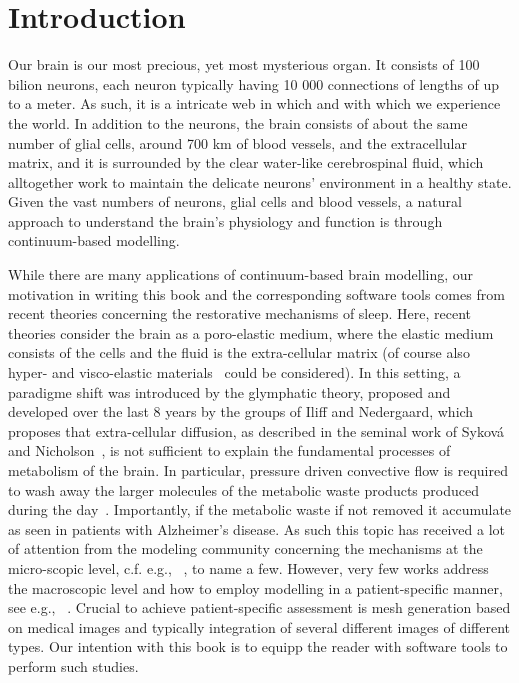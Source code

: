 \chapter{Introduction}
\label{chp:chp1}

Our brain is our most precious, yet most mysterious organ. It consists
of 100 bilion neurons, each neuron typically having 10 000 connections
of lengths of up to a meter. As such, it is a intricate web in which
and with which we experience the world. In addition to the neurons,
the brain consists of about the same number of glial cells, around 700
km of blood vessels, and the extracellular matrix, and it is
surrounded by the clear water-like cerebrospinal fluid, which
alltogether work to maintain the delicate neurons' environment in a
healthy state. Given the vast numbers of neurons, glial cells and
blood vessels, a natural approach to understand the brain's physiology
and function is through continuum-based modelling.

While there are many applications of continuum-based brain modelling, our
motivation in writing this book and the corresponding software tools  comes from recent theories 
concerning the restorative mechanisms of sleep. Here, recent theories 
consider the brain as a poro-elastic medium, where the elastic medium consists of the cells
and the fluid is the extra-cellular matrix (of course also hyper- and visco-elastic 
materials~\cite{goriely2015mechanics, budday2019fifty} could be considered). 
In this setting, a paradigme shift was introduced by the glymphatic theory, proposed and developed over the last 8 years by the 
groups of Iliff and Nedergaard, which proposes that
extra-cellular diffusion, as described in the seminal work
of Sykov{\'a} and Nicholson~\cite{sykova2008diffusion}, is
not sufficient to explain the fundamental processes of metabolism of the brain. 
In particular, pressure driven convective flow  is
required to wash away the larger molecules of the metabolic waste products
produced during the day~\cite{iliff2012paravascular,
  jessen2015glymphatic, xie2013sleep}. Importantly,  if the metabolic waste 
if not removed it accumulate as seen  in patients with  Alzheimer's disease. 
As such this topic has received a lot of attention from the modeling 
community concerning the mechanisms at the micro-scopic level,
c.f. e.g., ~\cite{aldea2019cerebrovascular, daversin2020mechanisms, diem2017arterial, 
holter2017interstitial, ray2019analysis, sharp2019dispersion, smith2017test}, to name a few. 
However, very few works address the macroscopic level and how to employ modelling in a patient-specific
manner, see e.g., ~\cite{chou2016fully, lee2019mixed}. Crucial to achieve patient-specific assessment 
is mesh generation based on medical images and typically integration of several different images
of different types. Our intention with this book is to equipp the reader with 
software tools to perform such studies.   

